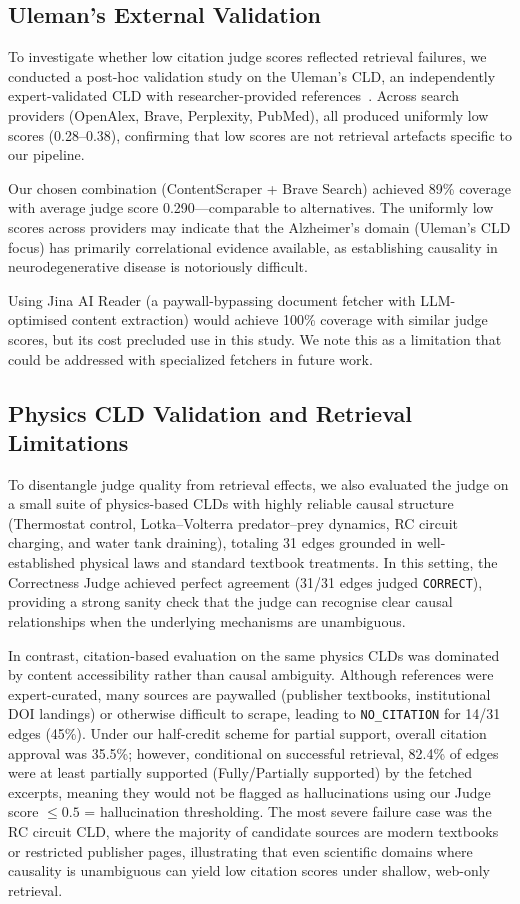 \subsection{Uleman's External Validation}

To investigate whether low citation judge scores reflected retrieval failures, we conducted a post-hoc validation study on the Uleman's CLD, an independently expert-validated CLD with researcher-provided references~\citep{uleman2021mapping}. Across search providers (OpenAlex, Brave, Perplexity, PubMed), all produced uniformly low scores (0.28--0.38), confirming that low scores are not retrieval artefacts specific to our pipeline.

Our chosen combination (ContentScraper + Brave Search) achieved 89\% coverage with average judge score 0.290---comparable to alternatives. The uniformly low scores across providers may indicate that the Alzheimer's domain (Uleman's CLD focus) has primarily correlational evidence available, as establishing causality in neurodegenerative disease is notoriously difficult.

Using Jina AI Reader (a paywall-bypassing document fetcher with LLM-optimised content extraction) would achieve 100\% coverage with similar judge scores, but its cost precluded use in this study. We note this as a limitation that could be addressed with specialized fetchers in future work.

\subsection{Physics CLD Validation and Retrieval Limitations}

To disentangle judge quality from retrieval effects, we also evaluated the judge on a small suite of physics-based CLDs with highly reliable causal structure (Thermostat control, Lotka--Volterra predator--prey dynamics, RC circuit charging, and water tank draining), totaling 31 edges grounded in well-established physical laws and standard textbook treatments. In this setting, the Correctness Judge achieved perfect agreement (31/31 edges judged \texttt{CORRECT}), providing a strong sanity check that the judge can recognise clear causal relationships when the underlying mechanisms are unambiguous.

In contrast, citation-based evaluation on the same physics CLDs was dominated by content accessibility rather than causal ambiguity. Although references were expert-curated, many sources are paywalled (publisher textbooks, institutional DOI landings) or otherwise difficult to scrape, leading to \texttt{NO\_CITATION} for 14/31 edges (45\%). Under our half-credit scheme for partial support, overall citation approval was 35.5\%; however, conditional on successful retrieval, 82.4\% of edges were at least partially supported (Fully/Partially supported) by the fetched excerpts, meaning they would not be flagged as hallucinations using our Judge score $\leq 0.5$ = hallucination thresholding. The most severe failure case was the RC circuit CLD, where the majority of candidate sources are modern textbooks or restricted publisher pages, illustrating that even scientific domains where causality is unambiguous can yield low citation scores under shallow, web-only retrieval.


